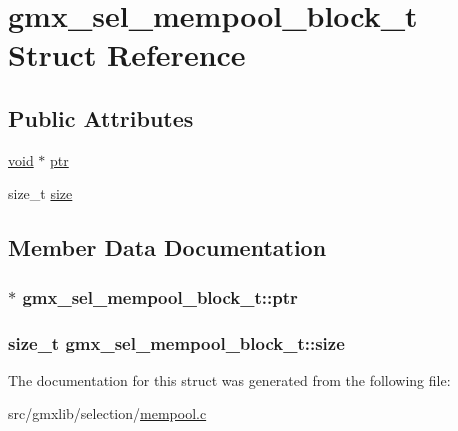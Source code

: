\hypertarget{structgmx__sel__mempool__block__t}{\section{gmx\-\_\-sel\-\_\-mempool\-\_\-block\-\_\-t \-Struct \-Reference}
\label{structgmx__sel__mempool__block__t}
}
\subsection*{\-Public \-Attributes}
\begin{DoxyCompactItemize}
\item 
\hyperlink{nbnxn__kernel__simd__4xn__outer_8h_a8dc3f4a797ed992dff49d2fa3477eee8}{void} $\ast$ \hyperlink{structgmx__sel__mempool__block__t_add25c5d49d8ff2d9655b80cdbb9ffb84}{ptr}
\item 
size\-\_\-t \hyperlink{structgmx__sel__mempool__block__t_a43c664f24005c1ae9a6ef94ef1b60b4f}{size}
\end{DoxyCompactItemize}


\subsection{\-Member \-Data \-Documentation}
\hypertarget{structgmx__sel__mempool__block__t_add25c5d49d8ff2d9655b80cdbb9ffb84}{
\subsubsection[{ptr}]{$\ast$ {\bf gmx\-\_\-sel\-\_\-mempool\-\_\-block\-\_\-t\-::ptr}}}\label{structgmx__sel__mempool__block__t_add25c5d49d8ff2d9655b80cdbb9ffb84}
\hypertarget{structgmx__sel__mempool__block__t_a43c664f24005c1ae9a6ef94ef1b60b4f}{
\subsubsection[{size}]{\setlength{\rightskip}{0pt plus 5cm}size\-\_\-t {\bf gmx\-\_\-sel\-\_\-mempool\-\_\-block\-\_\-t\-::size}}}\label{structgmx__sel__mempool__block__t_a43c664f24005c1ae9a6ef94ef1b60b4f}


\-The documentation for this struct was generated from the following file\-:\begin{DoxyCompactItemize}
\item 
src/gmxlib/selection/\hyperlink{mempool_8c}{mempool.\-c}\end{DoxyCompactItemize}
